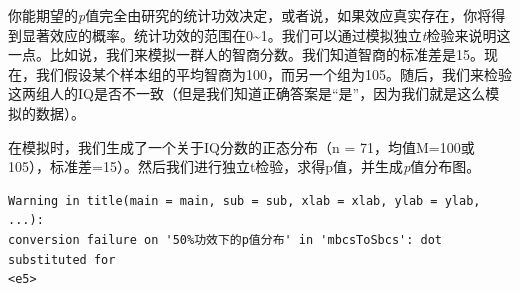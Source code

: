 \documentclass[
  letterpaper,
  DIV=11,
  numbers=noendperiod]{scrreprt}
\newenvironment{Shaded}{\begin{snugshade}}{\end{snugshade}}
\newcommand{\AttributeTok}[1]{\textcolor[rgb]{0.40,0.45,0.13}{#1}}
\newcommand{\CommentTok}[1]{\textcolor[rgb]{0.37,0.37,0.37}{#1}}
\newcommand{\ControlFlowTok}[1]{\textcolor[rgb]{0.00,0.23,0.31}{#1}}
\newcommand{\DecValTok}[1]{\textcolor[rgb]{0.68,0.00,0.00}{#1}}
\newcommand{\FloatTok}[1]{\textcolor[rgb]{0.68,0.00,0.00}{#1}}
\newcommand{\FunctionTok}[1]{\textcolor[rgb]{0.28,0.35,0.67}{#1}}
\newcommand{\NormalTok}[1]{\textcolor[rgb]{0.00,0.23,0.31}{#1}}
\newcommand{\OtherTok}[1]{\textcolor[rgb]{0.00,0.23,0.31}{#1}}
\newcommand{\SpecialCharTok}[1]{\textcolor[rgb]{0.37,0.37,0.37}{#1}}
\begin{document}
你能期望的\emph{p}值完全由研究的统计功效决定，或者说，如果效应真实存在，你将得到显著效应的概率。统计功效的范围在0\textasciitilde1。我们可以通过模拟独立\emph{t}检验来说明这一点。比如说，我们来模拟一群人的智商分数。我们知道智商的标准差是15。现在，我们假设某个样本组的平均智商为100，而另一个组为105。随后，我们来检验这两组人的IQ是否不一致（但是我们知道正确答案是``是''，因为我们就是这么模拟的数据）。

\begin{Shaded}
\end{Shaded}

在模拟时，我们生成了一个关于IQ分数的正态分布（n =
71，均值M=100或105），标准差=15）。然后我们进行独立t检验，求得p值，并生成\emph{p}值分布图。

\begin{verbatim}
Warning in title(main = main, sub = sub, xlab = xlab, ylab = ylab, ...):
conversion failure on '50%功效下的p值分布' in 'mbcsToSbcs': dot substituted for
<e5>
\end{verbatim}
\end{document}
